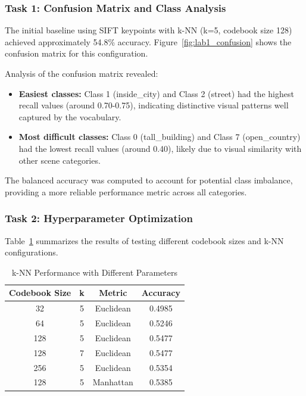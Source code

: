 \documentclass[conference]{IEEEtran}
\begin{document}
\subsubsection{Task 1: Confusion Matrix and Class Analysis}

The initial baseline using SIFT keypoints with k-NN (k=5, codebook size 128) achieved approximately 54.8\% accuracy. Figure~\ref{fig:lab1_confusion} shows the confusion matrix for this configuration.

Analysis of the confusion matrix revealed:
\begin{itemize}
\item \textbf{Easiest classes:} Class 1 (inside\_city) and Class 2 (street) had the highest recall values (around 0.70-0.75), indicating distinctive visual patterns well captured by the vocabulary.
\item \textbf{Most difficult classes:} Class 0 (tall\_building) and Class 7 (open\_country) had the lowest recall values (around 0.40), likely due to visual similarity with other scene categories.
\end{itemize}

The balanced accuracy was computed to account for potential class imbalance, providing a more reliable performance metric across all categories.

\subsubsection{Task 2: Hyperparameter Optimization}

Table~\ref{tab:lab1_knn_params} summarizes the results of testing different codebook sizes and k-NN configurations.

\begin{table}[H]
\centering
\caption{k-NN Performance with Different Parameters}
\label{tab:lab1_knn_params}
\begin{tabular}{@{}cccc@{}}
\toprule
\textbf{Codebook Size} & \textbf{k} & \textbf{Metric} & \textbf{Accuracy} \\ \midrule
32  & 5 & Euclidean & 0.4985 \\
64  & 5 & Euclidean & 0.5246 \\
128 & 5 & Euclidean & 0.5477 \\
128 & 7 & Euclidean & 0.5477 \\
256 & 5 & Euclidean & 0.5354 \\
128 & 5 & Manhattan & 0.5385 \\ \bottomrule
\end{tabular}
\end{table}
\end{document}
